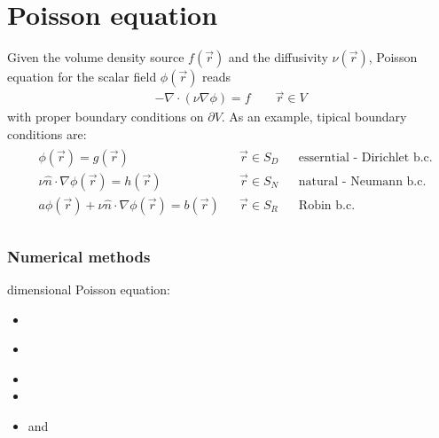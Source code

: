 \documentclass[letterpaper,10pt,english]{jupyterBook}
\begin{document}
\section{Poisson equation}
\label{\detokenize{ch/pde/elliptic:poisson-equation}}\label{\detokenize{ch/pde/elliptic:pde-elliptic-poisson}}
\sphinxAtStartPar
Given the volume density source \(f(\vec{r})\) and the diffusivity \(\nu(\vec{r})\), Poisson equation for the scalar field \(\phi(\vec{r})\) reads
\begin{equation*}
\begin{split}- \nabla \cdot ( \nu \nabla \phi) = f \qquad \vec{r} \in V\end{split}
\end{equation*}
\sphinxAtStartPar
with proper boundary conditions on \(\partial V\). As an example, tipical boundary conditions are:
\begin{equation*}
\begin{split}\begin{aligned}
  & \phi(\vec{r}) = g(\vec{r}) && \vec{r} \in S_D && \text{esserntial - Dirichlet b.c.}  \\
  & \nu \hat{n} \cdot \nabla \phi(\vec{r}) = h(\vec{r}) && \vec{r} \in S_N && \text{natural - Neumann b.c.}  \\
  & a \phi(\vec{r}) + \nu \hat{n} \cdot \nabla \phi(\vec{r}) = b(\vec{r}) && \vec{r} \in S_R && \text{Robin b.c.} \\
\end{aligned}\end{split}
\end{equation*}\subsubsection*{Numerical methods}

\sphinxhyphen{}dimensional Poisson equation:
\begin{itemize}
\item {} 
\sphinxAtStartPar
{\hyperref[\detokenize{ch/pde/fem-poisson-1d:pde-fem-poisson-1d}]{}}

\item {} 
\sphinxAtStartPar
{\hyperref[\detokenize{ch/pde/fvm-poisson-1d:pde-fvm-poisson-1d}]{}}

\item {} 
\sphinxAtStartPar
{}

\item {} 
\sphinxAtStartPar
{}

\item {} 
\sphinxAtStartPar
{} and 

\end{itemize}
\end{document}
